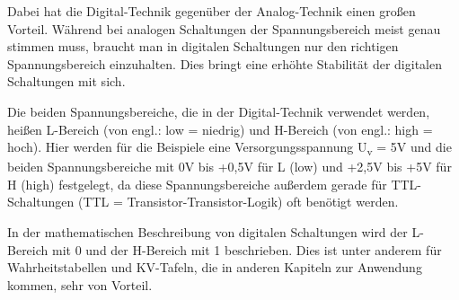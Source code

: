 Dabei hat die Digital-Technik gegenüber der Analog-Technik einen großen Vorteil. Während bei analogen Schaltungen der Spannungsbereich meist genau stimmen muss, braucht man in digitalen Schaltungen nur den richtigen Spannungsbereich einzuhalten. Dies bringt eine erhöhte Stabilität der digitalen Schaltungen mit sich.

Die beiden Spannungsbereiche, die in der Digital-Technik verwendet werden, heißen L-Bereich (von engl.: low = niedrig) und H-Bereich (von engl.: high = hoch). Hier werden für die Beispiele eine Versorgungsspannung U\textsubscript{v} = 5V und die beiden Spannungsbereiche mit 0V bis +0,5V für L (low) und +2,5V bis +5V für H (high) festgelegt, da diese Spannungsbereiche außerdem gerade für TTL-Schaltungen (TTL = Transistor-Transistor-Logik) oft benötigt werden.

In der mathematischen Beschreibung von digitalen Schaltungen wird der L-Bereich mit 0 und der H-Bereich mit 1 beschrieben. Dies ist unter anderem für Wahrheitstabellen und KV-Tafeln, die in anderen Kapiteln zur Anwendung kommen, sehr von Vorteil.

